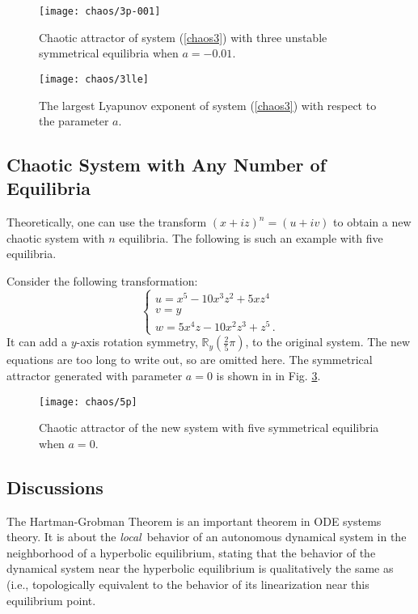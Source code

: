 \begin{figure}
\centering
\texttt{[image: chaos/3p-001]}
\caption{Chaotic attractor of system (\ref{chaos3}) with three unstable symmetrical equilibria when $a=-0.01$.}\label{3us}
\end{figure}

\begin{figure}
\texttt{[image: chaos/3lle]}
\caption{The largest Lyapunov exponent of system (\ref{chaos3}) with respect to the parameter $a$. }\label{3lle}
\end{figure}

\subsection{Chaotic System with Any Number of Equilibria}

Theoretically, one can use the transform $(x+iz)^{n}=(u+iv)$ to
obtain a new chaotic system with $n$ equilibria. The following is such an example with five equilibria.

Consider the following transformation:
\begin{equation}\label{tran5}
\left\{
\begin{array}{l}
u = x^5-10x^3z^2+5xz^4\\
v = y\\
w = 5x^4z-10x^2z^3+z^5\,.
\end{array}
\right.
\end{equation} %
It can add a $y$-axis rotation symmetry, $\mathbb{R}_{y}(\frac{2}{5}\pi)$, to the original system. The new equations are too long to write out, so are omitted here. The symmetrical attractor generated with parameter $a=0$ is shown in in Fig. \ref{5}.

\begin{figure}
\centering
\texttt{[image: chaos/5p]}
\caption{Chaotic attractor of the new system with five symmetrical equilibria when $a=0$.}\label{5}
\end{figure}

\subsection{Discussions}
The Hartman-Grobman Theorem is an important theorem in ODE systems theory. It is
about the \emph{local\,} behavior
of an autonomous dynamical system in the neighborhood of a hyperbolic
equilibrium,
stating that the behavior of the dynamical system near the hyperbolic
equilibrium is
qualitatively the same as (i.e., topologically equivalent to the behavior of its linearization near this equilibrium point.

